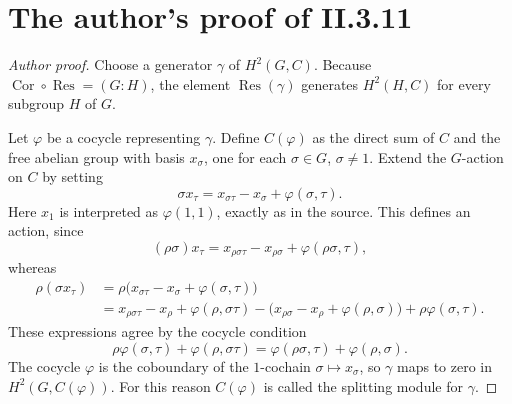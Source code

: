 \documentclass[11pt]{article}
\newcommand{\Res}{\operatorname{Res}}
\newcommand{\Cor}{\operatorname{Cor}}
\begin{document}
\section*{The author's proof of II.3.11}
\begin{proof}[Author proof]
Choose a generator $\gamma$ of $H^2(G,C)$. Because
$\Cor\circ\Res=(G:H)$, the element $\Res(\gamma)$ generates $H^2(H,C)$
for every subgroup $H$ of $G$.

Let $\varphi$ be a cocycle representing $\gamma$. Define $C(\varphi)$ as the
direct sum of $C$ and the free abelian group with basis $x_\sigma$, one for
each $\sigma\in G$, $\sigma\ne1$. Extend the $G$-action on $C$ by setting
\[
 \sigma x_\tau=x_{\sigma\tau}-x_\sigma+\varphi(\sigma,\tau).
\]
Here $x_1$ is interpreted as $\varphi(1,1)$, exactly as in the source.
This defines an action, since
\[
 (\rho\sigma)x_\tau=x_{\rho\sigma\tau}-x_{\rho\sigma}
                  +\varphi(\rho\sigma,\tau),
\]
whereas
\begin{align*}
 \rho(\sigma x_\tau)
 &=\rho\bigl(x_{\sigma\tau}-x_\sigma+\varphi(\sigma,\tau)\bigr)\\
 &=x_{\rho\sigma\tau}-x_\rho+\varphi(\rho,\sigma\tau)
  -\bigl(x_{\rho\sigma}-x_\rho+\varphi(\rho,\sigma)\bigr)
  +\rho\varphi(\sigma,\tau).
\end{align*}
These expressions agree by the cocycle condition
\[
 \rho\varphi(\sigma,\tau)+\varphi(\rho,\sigma\tau)
 =\varphi(\rho\sigma,\tau)+\varphi(\rho,\sigma).
\]
The cocycle $\varphi$ is the coboundary of the $1$-cochain
$\sigma\mapsto x_\sigma$, so $\gamma$ maps to zero in $H^2(G,C(\varphi))$.
For this reason $C(\varphi)$ is called the splitting module for $\gamma$.


\end{proof}
\end{document}
